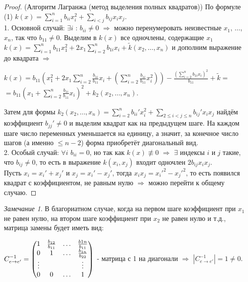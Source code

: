 \documentclass[a4paper, 12pt]{article}
\theoremstyle{definition}
\theoremstyle{plain}
\theoremstyle{remark}
\newtheorem*{remark}{Замечание}
\begin{document}
  \begin{proof} (Алгоритм Лагранжа (метод выделения полных квадратов))
    По формуле (1) $k(x)=\sum\limits_{i=1}^nb_{ii}x_i^2+\sum\limits_{i<j}b_{ij}x_ix_j$.\\
    1. Основной случай: $\exists i$ : $b_{ii}\neq0$ $\Longrightarrow$ можно перенумеровать неизвестные $x_1$, $\ldots$, $x_n$, так что $b_{11}\neq0$. Выделим в $k(x)$ все одночлены, содержащие $x_1$\\
    $k(x)=\sum\limits_{i=1}^nb_{11}x_1^2+2x_1\sum\limits_{i=2}^nb_{1i}x_i+\widetilde{k}(x_2,\ldots, x_n)$ и дополним выражение до квадрата $\Longrightarrow$\\
    \begin{center}
      $k(x) = b_{11}(x_1^2+2x_1\sum\limits_{i=2}^n\frac{b_{1i}}{b_{11}}x_i+(\sum\limits_{i=2}^n\frac{b_{1i}}{b_{11}}x_i^2))-\frac{(\sum\limits_{i=2}^nb_{1i}x_i)^2}{b_{11}}+\widetilde{k} = $\\
      $=b_{11}(x_1+\sum\limits_{i=2}^n\frac{b_{1i}}{b_{11}}x_i)^2+k_2(x_2, \ldots,x_n)$.
    \end{center}
    Затем для формы $k_2(x_2,\ldots, x_n)=\sum\limits_{i=2}^nb_{ii}'x_i^2+\sum\limits_{2\leqslant i<j\leqslant n}b_{ij}'x_ix_j$ найдём коэффициент $b_{jj}'\neq0$ и выделим квадрат как на предыдущем шаге. На каждом шаге число переменных уменьшается на единицу, а значит, за конечное число шагов (а именно $\leqslant n-2$) форма приобретёт диагональный вид.\\
    2. Особый случай: $\forall i$ $b_{ii}=0$, но так как $k(x)\not\equiv0$ $\Longrightarrow$ $\exists$ индексы $i$ и $j$ такие, что $b_{ij}\neq0$, то есть в выражение $k(x_i, x_j)$ входит одночлен $2b_{ij}x_ix_j$.\\
    Пусть $x_i=x_i'+x_j'$ и $x_j=x_i'-x_j'$, тогда $x_ix_j = x_i'^2-x_j'^2$, то есть появился квадрат с коэффициентом, не равным нулю $\Longrightarrow$ можно перейти к общему случаю. 
  \end{proof}
  \begin{remark}
    В благориатном случае, когда на первом шаге коэффициент при $x_1$ не равен нулю, на втором шаге коэффициент при $x_2$ не равен нулю и т.д., матрица замены будет иметь вид:\\
    \begin{center}
      $C_{e\rightarrow e'}^{-1}=\begin{pmatrix}
        1 & \frac{b_{12}}{b_{11}} & \ldots & \frac{b{1n}}{b_{11}}\\
        0 & 1 & \ldots & \frac{b_{1n}}{b_{22}}\\
        \vdots & \null & \null & \vdots\\
        0 & 0 & \ldots & 1
      \end{pmatrix}$ - матрица с 1 на диагонали $\Longrightarrow$ $|C_{e\rightarrow e'}^{-1}|=1\neq0$.
    \end{center}
  \end{remark}
\end{document}
